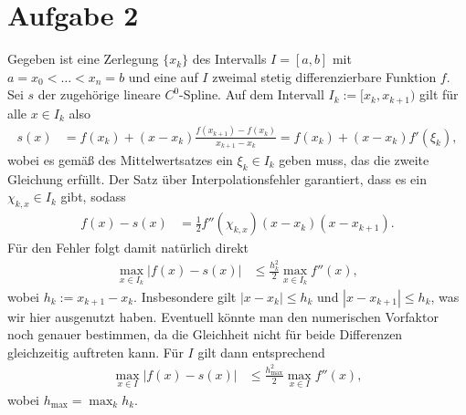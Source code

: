 \documentclass[english, parskip=full]{scrartcl}
\newcommand{\tecxt}{}
\begin{document}
\section*{Aufgabe 2}
Gegeben ist eine Zerlegung $\{x_k\}$ des Intervalls $I=[a,b]$ mit  $a=x_0<\dots<x_n=b$ und eine auf $I$ zweimal stetig differenzierbare Funktion $f$.
Sei $s$ der zugehörige lineare $C^0$-Spline.
Auf dem Intervall $I_k := [x_k,x_{k+1})$ gilt für alle $x\in I_k$ also
\begin{align}
s(x) &= f(x_k) + (x - x_k)\frac{ f(x_{k+1}) - f(x_k)}{x_{k+1} - x_k} = f(x_k) + (x-x_k) f'(\xi_k),
\end{align}
wobei es gemäß des Mittelwertsatzes ein $\xi_k\in I_k$ geben muss, das die zweite Gleichung erfüllt.
Der Satz über Interpolationsfehler garantiert, dass es ein $\chi_{k,x}\in I_k$ gibt, sodass 
\begin{align}
f(x) - s(x) &= \frac{1}{2}f''(\chi_{k,x}) (x-x_k)(x-x_{k+1}).
\end{align}
Für den Fehler folgt damit natürlich direkt
\begin{align}
\max_{x\in I_k} |f(x) - s(x)| &\le \frac{h_k^2}{2}\max_{x\in I_k} f''(x),
\end{align}
wobei $h_k := x_{k+1} - x_k$.
Insbesondere gilt $|x-x_k|\le h_k$ und $|x-x_{k+1}|\le h_k$, was wir hier ausgenutzt haben.
Eventuell könnte man den numerischen Vorfaktor noch genauer bestimmen, da die Gleichheit nicht für beide Differenzen gleichzeitig auftreten kann.
Für $I$ gilt dann entsprechend
\begin{align}
\max_{x\in I} |f(x) - s(x)| &\le \frac{h_\tecxt\text{max}^2}{2}\max_{x\in I} f''(x),
\end{align}
wobei $h_\tecxt\text{max} = \max_k h_k$.
\end{document}
